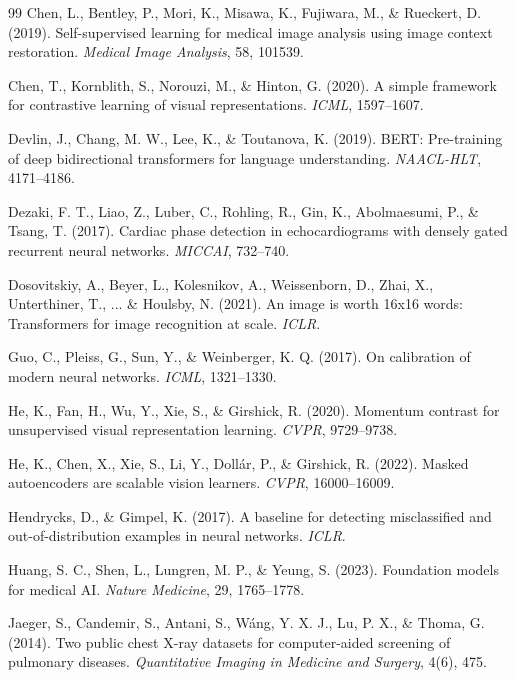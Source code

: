\documentclass[11pt,a4paper]{article}
\begin{document}
\begin{thebibliography}{99}
Chen, L., Bentley, P., Mori, K., Misawa, K., Fujiwara, M., \& Rueckert, D. (2019).
Self-supervised learning for medical image analysis using image context restoration.
\textit{Medical Image Analysis}, 58, 101539.

Chen, T., Kornblith, S., Norouzi, M., \& Hinton, G. (2020).
A simple framework for contrastive learning of visual representations.
\textit{ICML}, 1597--1607.

Devlin, J., Chang, M. W., Lee, K., \& Toutanova, K. (2019).
BERT: Pre-training of deep bidirectional transformers for language understanding.
\textit{NAACL-HLT}, 4171--4186.

Dezaki, F. T., Liao, Z., Luber, C., Rohling, R., Gin, K., Abolmaesumi, P., \& Tsang, T. (2017).
Cardiac phase detection in echocardiograms with densely gated recurrent neural networks.
\textit{MICCAI}, 732--740.

Dosovitskiy, A., Beyer, L., Kolesnikov, A., Weissenborn, D., Zhai, X., Unterthiner, T., ... \& Houlsby, N. (2021).
An image is worth 16x16 words: Transformers for image recognition at scale.
\textit{ICLR}.

Guo, C., Pleiss, G., Sun, Y., \& Weinberger, K. Q. (2017).
On calibration of modern neural networks.
\textit{ICML}, 1321--1330.

He, K., Fan, H., Wu, Y., Xie, S., \& Girshick, R. (2020).
Momentum contrast for unsupervised visual representation learning.
\textit{CVPR}, 9729--9738.

He, K., Chen, X., Xie, S., Li, Y., Doll\'{a}r, P., \& Girshick, R. (2022).
Masked autoencoders are scalable vision learners.
\textit{CVPR}, 16000--16009.

Hendrycks, D., \& Gimpel, K. (2017).
A baseline for detecting misclassified and out-of-distribution examples in neural networks.
\textit{ICLR}.

Huang, S. C., Shen, L., Lungren, M. P., \& Yeung, S. (2023).
Foundation models for medical AI.
\textit{Nature Medicine}, 29, 1765--1778.

Jaeger, S., Candemir, S., Antani, S., W\'{a}ng, Y. X. J., Lu, P. X., \& Thoma, G. (2014).
Two public chest X-ray datasets for computer-aided screening of pulmonary diseases.
\textit{Quantitative Imaging in Medicine and Surgery}, 4(6), 475.


\end{thebibliography}
\end{document}
